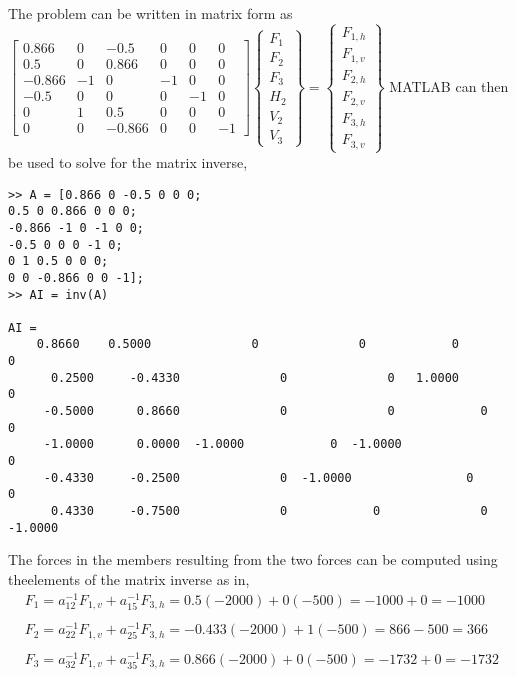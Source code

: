 \documentclass[../main.tex]{subfiles}
\begin{document}
\begin{enumerate}[label=\bfseries(\alph*)]
The problem can be written in matrix form as
\bigbreak
$\left[\begin{array}{cccccc}
0.866 & 0 & -0.5 & 0 & 0 & 0 \\
0.5 & 0 & 0.866 & 0 & 0 & 0 \\
-0.866 & -1 & 0 & -1 & 0 & 0 \\
-0.5 & 0 & 0 & 0 & -1 & 0 \\
0 & 1 & 0.5 & 0 & 0 & 0 \\
0 & 0 & -0.866 & 0 & 0 & -1
\end{array}\right]\left\{\begin{array}{c}
F_{1} \\
F_{2} \\
F_{3} \\
H_{2} \\
V_{2} \\
V_{3}
\end{array}\right\}=\left\{\begin{array}{c}
F_{1, h} \\
F_{1, v} \\
F_{2, h} \\
F_{2, v} \\
F_{3, h} \\
F_{3, v}
\end{array}\right\}$
\bigbreak
MATLAB can then be used to solve for the matrix inverse,
\bigbreak
\begin{lstlisting}[numbers=none]
>> A = [0.866 0 -0.5 0 0 0;
0.5 0 0.866 0 0 0;
-0.866 -1 0 -1 0 0;
-0.5 0 0 0 -1 0;
0 1 0.5 0 0 0;
0 0 -0.866 0 0 -1];
>> AI = inv(A)

AI =
  	0.8660 	  0.5000 			  0 			 0 			  0 			  0
 	  0.2500 	 -0.4330 			  0 			 0 	 1.0000 			  0
 	 -0.5000 	  0.8660 			  0 			 0			  0 			  0
	 -1.0000 	  0.0000  -1.0000 			 0 	-1.0000 				0
	 -0.4330 	 -0.2500 			  0  -1.0000 				0 				0
	  0.4330 	 -0.7500 			  0 		   0 			  0 	-1.0000
\end{lstlisting}
\bigbreak
The forces in the members resulting from the two forces can be computed using the\smallbreak elements of the matrix inverse as in,
\bigbreak$
\begin{aligned}
&F_{1}=a_{12}^{-1} F_{1, v}+a_{15}^{-1} F_{3, h}=0.5(-2000)+0(-500)=-1000+0=-1000 \\\\
&F_{2}=a_{22}^{-1} F_{1, v}+a_{25}^{-1} F_{3, h}=-0.433(-2000)+1(-500)=866-500=366 \\\\
&F_{3}=a_{32}^{-1} F_{1, v}+a_{35}^{-1} F_{3, h}=0.866(-2000)+0(-500)=-1732+0=-1732
\end{aligned}$
\bigbreak



\end{enumerate}
\end{document}

